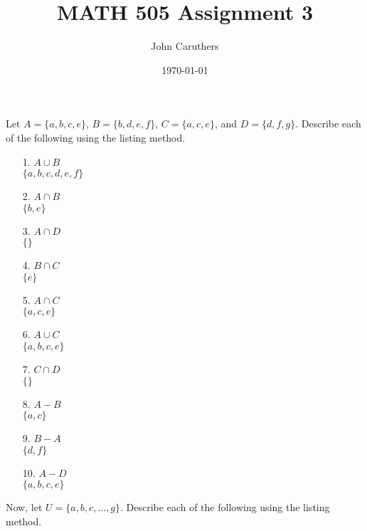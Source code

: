 \documentclass{article}
\title{MATH 505 Assignment 3}
\author{John Caruthers}
\date\today
\begin{document}
\maketitle

Let $A = \{a, b, c, e\}$, $B = \{b, d, e, f\}$, $C = \{a, c, e\}$, and $D = \{d, f, g\}$. Describe each of the following using the listing method.

\begin{itemize}
    \item[1.] $A \cup B$\\
    {\color{blue}$\{a, b, c, d, e, f\}$}
    
    \item[2.] $A \cap B$\\
    {\color{blue}$\{b, e\}$}
    
    \item[3.] $A \cap D$\\
    {\color{blue}$\{\}$}
    
    \item[4.] $B \cap C$\\
    {\color{blue}$\{e\}$}
    
    \item[5.] $A \cap C$\\
    {\color{blue}$\{a, c, e\}$}
    
    \item[6.] $A \cup C$\\
    {\color{blue}$\{a, b, c, e\}$}
    
    \item[7.] $C \cap D$\\
    {\color{blue}$\{\}$}
    
    \item[8.] $A - B$\\
    {\color{blue}$\{a, c\}$}
    
    \item[9.] $B - A$\\
    {\color{blue}$\{d, f\}$}
    
    \item[10.] $A - D$\\
    {\color{blue}$\{a, b, c, e\}$}
\end{itemize}

Now, let $U = \{a, b, c, ..., g\}$. Describe each of the following using the listing method.
\end{document}
